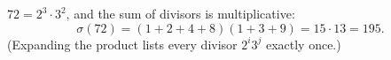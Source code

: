$72=2^3\cdot3^2$, and the sum of divisors is multiplicative:
\[
\sigma(72)=(1+2+4+8)(1+3+9)=15\cdot13=\boxed{195}.
\]
(Expanding the product lists every divisor $2^i3^j$ exactly once.)
